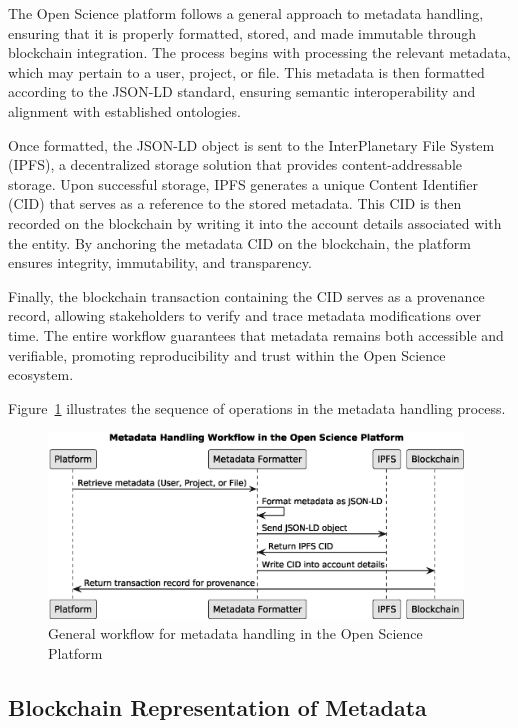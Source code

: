 \documentclass{article}
\begin{document}
The Open Science platform follows a general approach to metadata handling, ensuring that it is properly formatted, stored, and made immutable through blockchain integration. The process begins with processing the relevant metadata, which may pertain to a user, project, or file. This metadata is then formatted according to the JSON-LD standard, ensuring semantic interoperability and alignment with established ontologies.

Once formatted, the JSON-LD object is sent to the InterPlanetary File System (IPFS), a decentralized storage solution that provides content-addressable storage. Upon successful storage, IPFS generates a unique Content Identifier (CID) that serves as a reference to the stored metadata. This CID is then recorded on the blockchain by writing it into the account details associated with the entity. By anchoring the metadata CID on the blockchain, the platform ensures integrity, immutability, and transparency.

Finally, the blockchain transaction containing the CID serves as a provenance record, allowing stakeholders to verify and trace metadata modifications over time. The entire workflow guarantees that metadata remains both accessible and verifiable, promoting reproducibility and trust within the Open Science ecosystem.

Figure~\ref{fig:metadata_workflow} illustrates the sequence of operations in the metadata handling process.


\begin{figure}[htbp]
      \centering
      \includegraphics[width=0.98\textwidth, keepaspectratio]{metadata_workflow_sequence.eps}
      \caption{General workflow for metadata handling in the Open Science Platform}
      \label{fig:metadata_workflow}
\end{figure}

\subsection{Blockchain Representation of Metadata}
\end{document}
